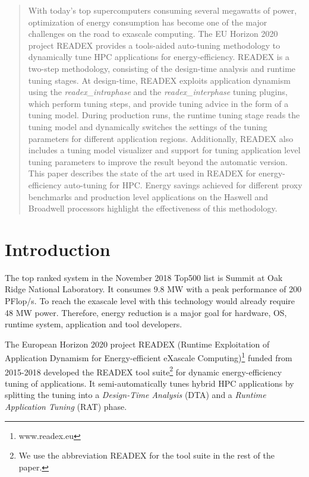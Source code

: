 \documentclass[runningheads]{llncs}
\begin{document}
\begin{abstract}
With today's top supercomputers consuming several mega\-watts of power, optimization of energy consumption has become one of the major challenges on the road to exascale computing.
The EU Horizon 2020 project READEX provides a tools-aided auto-tuning methodology to dynamically tune HPC applications for energy-efficiency. READEX is a two-step methodology, consisting of the design-time analysis and runtime tuning stages. At design-time, READEX exploits application dynamism using the \textit{readex\_intraphase} and the \textit{readex\_interphase} tuning plugins, which perform tuning steps, and provide tuning advice in the form of a tuning model. During production runs, the runtime tuning stage reads the tuning model and dynamically switches the settings of the tuning parameters for different application regions. Additionally, READEX also includes a tuning model visualizer and support for tuning application level tuning parameters to improve the result beyond the automatic version. This paper describes the state of the art used in READEX for energy-efficiency auto-tuning for HPC. Energy savings achieved for different proxy benchmarks and production level applications on the Haswell and Broadwell processors highlight the effectiveness of this methodology.

\end{abstract}

\section{Introduction} \label{sec:introduction}

The top ranked system in the November 2018 Top500 list is Summit at Oak Ridge National Laboratory. It consumes 9.8 MW with a peak performance of 200 PFlop/s. To reach the exascale level with this technology would already require 48 MW power. Therefore, energy reduction is a major goal for hardware, OS, runtime system, application and tool developers. 

The European Horizon 2020 project READEX (Runtime Exploitation of Application Dynamism for Energy-efficient eXascale Computing)\footnote{www.readex.eu} funded from 2015-2018 developed the READEX tool suite\footnote{We use the abbreviation READEX for the tool suite in the rest of the paper.} for dynamic energy-efficiency tuning of applications. It semi-automatically tunes hybrid HPC applications by splitting the tuning into a \textit{Design-Time Analysis} (DTA) and a \textit{Runtime Application Tuning} (RAT) phase. 
\end{document}

